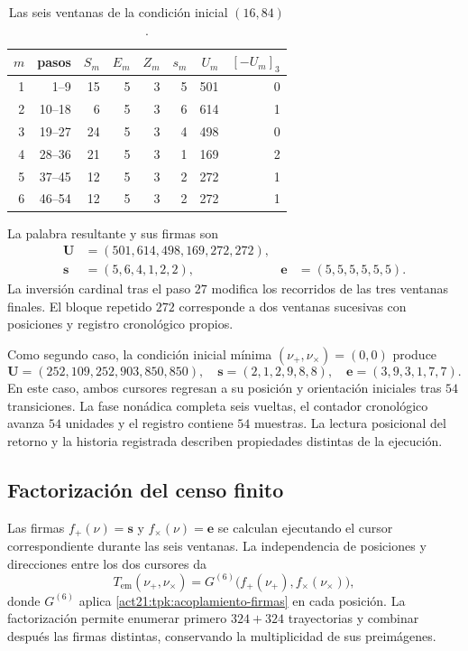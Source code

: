 \begin{table}[htbp]
\caption{Las seis ventanas de la condición inicial \((16,84)\).}
\label{act21:tpk:tabla-seis501}
\begin{tabular}{@{}rrrrrrrr@{}}
\toprule
\(m\)&pasos&\(S_m\)&\(E_m\)&\(Z_m\)&\(s_m\)&\(U_m\)&\([-U_m]_3\)\\
\midrule
1&1--9&15&5&3&5&501&0\\
2&10--18&6&5&3&6&614&1\\
3&19--27&24&5&3&4&498&0\\
4&28--36&21&5&3&1&169&2\\
5&37--45&12&5&3&2&272&1\\
6&46--54&12&5&3&2&272&1\\
\bottomrule
\end{tabular}
\end{table}

La palabra resultante y sus firmas son
\begin{align*}
 \mathbf U&=(501,614,498,169,272,272),\\
 \mathbf s&=(5,6,4,1,2,2),&
 \mathbf e&=(5,5,5,5,5,5).
\end{align*}
La inversión cardinal tras el paso \(27\) modifica los recorridos de las
tres ventanas finales. El bloque repetido \(272\) corresponde a dos
ventanas sucesivas con posiciones y registro cronológico propios.

Como segundo caso, la condición inicial mínima \((\nu_+,\nu_\times)=(0,0)\)
produce
\[
 \mathbf U=(252,109,252,903,850,850),\quad
 \mathbf s=(2,1,2,9,8,8),\quad
 \mathbf e=(3,9,3,1,7,7).
\]
En este caso, ambos cursores regresan a su posición y orientación iniciales
tras \(54\) transiciones. La fase nonádica completa seis vueltas, el
contador cronológico avanza \(54\) unidades y el registro contiene
\(54\) muestras. La lectura posicional del retorno y
la historia registrada describen propiedades distintas de la ejecución.

\subsection{Factorización del censo finito}
\label{act21:tpk:censo}

Las firmas \(f_+(\nu)=\mathbf s\) y \(f_\times(\nu)=\mathbf e\) se
calculan ejecutando el cursor correspondiente durante las seis ventanas.
La independencia de posiciones y direcciones entre los dos cursores da
\begin{equation}
 T_{\mathrm{em}}(\nu_+,\nu_\times)
   =G^{(6)}\bigl(f_+(\nu_+),f_\times(\nu_\times)\bigr),
 \label{act21:tpk:factorizacion}
\end{equation}
donde \(G^{(6)}\) aplica \eqref{act21:tpk:acoplamiento-firmas} en cada posición.
La factorización permite enumerar primero \(324+324\) trayectorias y
combinar después las firmas distintas, conservando la multiplicidad de
sus preimágenes.


